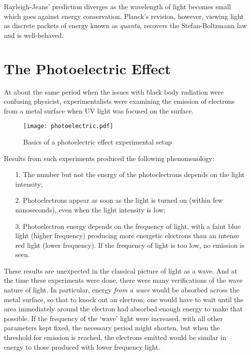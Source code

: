Rayleigh-Jeans' prediction diverges as the wavelength of light becomes small
which goes against energy conservation. Planck's revision, however, viewing light as discrete
packets of energy known as \textit{quanta}, recovers the Stefan-Boltzmann law
and is well-behaved.  


\section{The Photoelectric Effect}

At about the same period when the issues with black body radiation were
confusing physicist, experimentalists were examining the emission of electrons
from a metal surface when UV light was focused on the surface.

\begin{figure}[H]
  \centering
    \texttt{[image: photoelectric.pdf]}
    \caption{Basics of a photoelectric effect experimental setup}
\end{figure}

Results from such experiments produced the following phenomenology: 

\begin{itemize}
  \item[1.] The number but not the energy of the photoelectrons depends on the
    light intensity; 
  \item[2.] Photoelectrons appear as soon as the light is turned on (within few
    nanoseconds), even when the light intensity is low;
  \item[3.] Photoelectron energy depends on the frequency of light, with
    a faint blue light (higher frequency) producing more energetic electrons
    than an intense red light (lower frequency). If the frequency of light is
    too low, no emission is seen.
\end{itemize}

These results are unexpected in the classical picture of light as a wave. And
at the time these experiments were done, there were many verifications of the
wave nature of light. In particular, energy \textit{from a wave} would be absorbed
across the metal surface, so that to knock out an electron, one would have to
wait until the area immediately around the electron had absorbed enough energy
to make that possible. If the frequency of the `wave' light were increased, with all
other parameters kept fixed, the necessary period might shorten, but when the
threshold for emission is reached, the electrons emitted would be similar in
energy to those produced with lower frequency light. 

